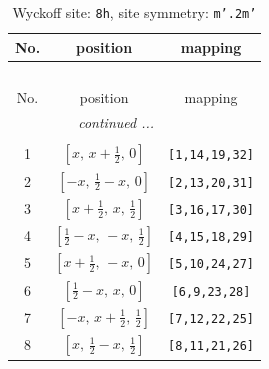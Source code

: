 \documentclass[fleqn,8pt]{jsarticle}
\begin{document}
\begin{longtable}{ccc}
\caption{Wyckoff site: {\tt 8h}, site symmetry: {\tt m'.2m'}}
 \\
 \hline \hline
No. & position & mapping \\ \hline \endfirsthead

\multicolumn{2}{l}{\tablename\ \thetable{}} \\
 \hline \hline
No. & position & mapping \\ \hline \endhead

 \hline \hline
\multicolumn{2}{r}{\footnotesize\it continued ...} \\ \endfoot

 \hline \hline
\multicolumn{2}{r}{} \\ \endlastfoot

1 & $\left[ x,\, x + \frac{1}{2},\, 0 \right]$ & {\tt [1,14,19,32]} \\ \hline
2 & $\left[ - x,\, \frac{1}{2} - x,\, 0 \right]$ & {\tt [2,13,20,31]} \\ \hline
3 & $\left[ x + \frac{1}{2},\, x,\, \frac{1}{2} \right]$ & {\tt [3,16,17,30]} \\ \hline
4 & $\left[ \frac{1}{2} - x,\, - x,\, \frac{1}{2} \right]$ & {\tt [4,15,18,29]} \\ \hline
5 & $\left[ x + \frac{1}{2},\, - x,\, 0 \right]$ & {\tt [5,10,24,27]} \\ \hline
6 & $\left[ \frac{1}{2} - x,\, x,\, 0 \right]$ & {\tt [6,9,23,28]} \\ \hline
7 & $\left[ - x,\, x + \frac{1}{2},\, \frac{1}{2} \right]$ & {\tt [7,12,22,25]} \\ \hline
8 & $\left[ x,\, \frac{1}{2} - x,\, \frac{1}{2} \right]$ & {\tt [8,11,21,26]} \\
\end{longtable}
\renewcommand{\arraystretch}{1.2}
\end{document}
